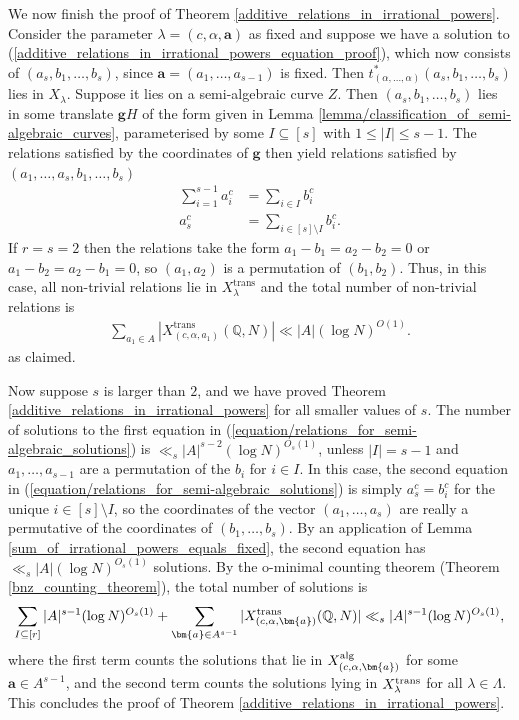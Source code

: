\documentclass[9pt]{amsart}
\theoremstyle{my_theorem_style}
\numberwithin{definition}{section}
\newcommand{\Q}{\mathbb{Q}}
\renewcommand{\vec}[1]{\bm{#1}}
\begin{document}
We now finish the proof of Theorem \ref{additive_relations_in_irrational_powers}. Consider the parameter $\lambda = (c, \alpha, \vec{a})$ as fixed and suppose we have a solution to (\ref{additive_relations_in_irrational_powers_equation_proof}), which now consists of $(a_s, b_1, \dots, b_s)$, since $\vec{a} = (a_1, \dots, a_{s - 1})$ is fixed. Then $t_{(\alpha, \dots, \alpha)}^* (a_s, b_1, \dots, b_s)$ lies in $X_\lambda$. Suppose it lies on a semi-algebraic curve $Z$. Then $(a_s, b_1, \dots, b_s)$ lies in some translate $\vec{g}H$ of the form given in Lemma \ref{lemma/classification_of_semi-algebraic_curves}, parameterised by some $I \subseteq [s]$ with $1 \leq |I| \leq s - 1$. The relations satisfied by the coordinates of $\vec{g}$ then yield relations satisfied by $(a_1, \dots, a_s, b_1, \dots, b_s)$
\begin{align}
\label{equation/relations_for_semi-algebraic_solutions}
    \sum_{i = 1}^{s - 1} a_i^c &=
    \sum_{i \in I} b_i^c \\
    a_s^c &= \sum_{i \in [s] \setminus I} b_i^c.
\end{align}
If $r = s = 2$ then the relations take the form $a_1 - b_1 = a_2 - b_2 = 0$ or $a_1 - b_2 = a_2 - b_1 = 0$, so $(a_1, a_2)$ is a permutation of $(b_1, b_2)$. Thus, in this case, all non-trivial relations lie in $X_\lambda^{\textrm{trans}}$ and the total number of non-trivial relations is
\begin{align*}
    \sum_{a_1 \in A} |X_{(c, \alpha, a_1)}^{\textrm{trans}}(\Q, N)| \ll |A| (\log N)^{O(1)}.
\end{align*}
as claimed.

Now suppose $s$ is larger than $2$, and we have proved Theorem \ref{additive_relations_in_irrational_powers} for all smaller values of $s$. The number of solutions to the first equation in (\ref{equation/relations_for_semi-algebraic_solutions}) is $\ll_s |A|^{s - 2} (\log N)^{O_s(1)}$, unless $|I| = s - 1$ and $a_1, \dots, a_{s - 1}$ are a permutation of the $b_i$ for $i \in I$. In this case, the second equation in (\ref{equation/relations_for_semi-algebraic_solutions}) is simply $a_s^c = b_i^c$ for the unique $i \in [s] \setminus I$, so the coordinates of the vector $(a_1, \dots, a_s)$ are really a permutative of the coordinates of $(b_1, \dots, b_s)$. By an application of Lemma \ref{sum_of_irrational_powers_equals_fixed}, the second equation has $\ll_s |A|(\log N)^{O_s(1)}$ solutions. By the o-minimal counting theorem (Theorem \ref{bnz_counting_theorem}), the total number of solutions is
\begin{align*}
    \sum_{I \subseteq [r]}
    |A|^{s - 1}(\log{N})^{O_s(1)} +
    \sum_{\vec{a} \in A^{s - 1}}
    |X_{(c, \alpha, \vec{a})}^{\rm trans}(\Q, N)| \ll_s
    |A|^{s - 1}(\log{N})^{O_s(1)},
\end{align*}
where the first term counts the solutions that lie in $X_{(c, \alpha, \vec{a})}^{\rm alg}$ for some $\vec{a} \in A^{s - 1}$, and the second term counts the solutions lying in $X_{\lambda}^{\rm trans}$ for all $\lambda \in \Lambda$. This concludes the proof of Theorem \ref{additive_relations_in_irrational_powers}.
\end{document}
